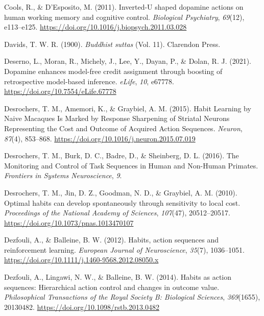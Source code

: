 \documentclass[
  man]{apa6}
\newlength{\cslhangindent}
\newlength{\cslentryspacingunit} %
\newenvironment{CSLReferences}[2] %
 {%
  \setlength{\parindent}{0pt}
  \ifodd #1
  \let\oldpar\par
  \def\par{\hangindent=\cslhangindent\oldpar}
  \fi
  \setlength{\parskip}{#2\cslentryspacingunit}
 }%
 {}
\begin{document}
\begin{CSLReferences}{1}{0}
\leavevmode{}%
Cools, R., \& D'Esposito, M. (2011). Inverted-{U} shaped dopamine actions on human working memory and cognitive control. \emph{Biological Psychiatry}, \emph{69}(12), e113--e125. \url{https://doi.org/10.1016/j.biopsych.2011.03.028}

\leavevmode{}%
Davids, T. W. R. (1900). \emph{Buddhist suttas} (Vol. 11). {Clarendon Press}.

\leavevmode{}%
Deserno, L., Moran, R., Michely, J., Lee, Y., Dayan, P., \& Dolan, R. J. (2021). Dopamine enhances model-free credit assignment through boosting of retrospective model-based inference. \emph{eLife}, \emph{10}, e67778. \url{https://doi.org/10.7554/eLife.67778}

\leavevmode{}%
Desrochers, T. M., Amemori, K., \& Graybiel, A. M. (2015). Habit {Learning} by {Naive Macaques Is Marked} by {Response Sharpening} of {Striatal Neurons Representing} the {Cost} and {Outcome} of {Acquired Action Sequences}. \emph{Neuron}, \emph{87}(4), 853--868. \url{https://doi.org/10.1016/j.neuron.2015.07.019}

\leavevmode{}%
Desrochers, T. M., Burk, D. C., Badre, D., \& Sheinberg, D. L. (2016). The {Monitoring} and {Control} of {Task Sequences} in {Human} and {Non-Human Primates}. \emph{Frontiers in Systems Neuroscience}, \emph{9}.

\leavevmode{}%
Desrochers, T. M., Jin, D. Z., Goodman, N. D., \& Graybiel, A. M. (2010). Optimal habits can develop spontaneously through sensitivity to local cost. \emph{Proceedings of the National Academy of Sciences}, \emph{107}(47), 20512--20517. \url{https://doi.org/10.1073/pnas.1013470107}

\leavevmode{}%
Dezfouli, A., \& Balleine, B. W. (2012). Habits, action sequences and reinforcement learning. \emph{European Journal of Neuroscience}, \emph{35}(7), 1036--1051. \url{https://doi.org/10.1111/j.1460-9568.2012.08050.x}

\leavevmode{}%
Dezfouli, A., Lingawi, N. W., \& Balleine, B. W. (2014). Habits as action sequences: Hierarchical action control and changes in outcome value. \emph{Philosophical Transactions of the Royal Society B: Biological Sciences}, \emph{369}(1655), 20130482. \url{https://doi.org/10.1098/rstb.2013.0482}


\end{CSLReferences}
\end{document}
